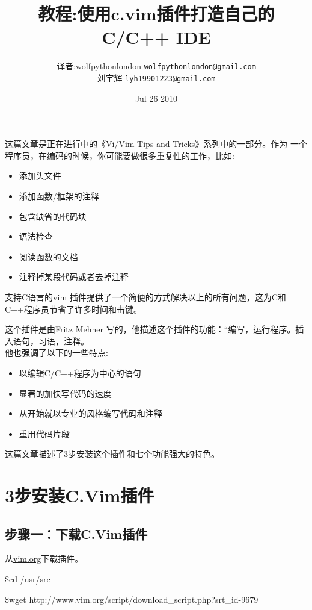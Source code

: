 \documentclass[11pt]{article}
\begin{document}
\title{教程:使用c.vim插件打造自己的C/C++ IDE}
\author{译者:wolfpythonlondon \texttt{wolfpythonlondon@gmail.com} \\ 刘宇辉 \texttt{lyh19901223@gmail.com}}
\date{Jul 26 2010}
\maketitle

这篇文章是正在进行中的《Vi/Vim Tips and Tricks》系列中的一部分。作为
一个程序员，在编码的时候，你可能要做很多重复性的工作，比如:\\

\begin{itemize}
\item{添加头文件}
\item{添加函数/框架的注释}
\item{包含缺省的代码块}
\item{语法检查}
\item{阅读函数的文档}
\item{注释掉某段代码或者去掉注释}
\end{itemize}

支持C语言的vim 插件提供了一个简便的方式解决以上的所有问题，这为C和C++程序员节省了许多时间和击键。

这个插件是由Fritz Mehner 写的，他描述这个插件的功能：“编写，运行程序。插入语句，习语，注释。\\

他也强调了以下的一些特点:\\
\begin{itemize}
\item{以编辑C/C++程序为中心的语句}
\item{显著的加快写代码的速度}
\item{从开始就以专业的风格编写代码和注释}
\item{重用代码片段}\\
\end{itemize}

这篇文章描述了3步安装这个插件和七个功能强大的特色。

\section*{3步安装C.Vim插件}
\subsection*{步骤一：下载C.Vim插件}
从\href{http://www.vim.org}{vim.org}下载插件。

\$cd /usr/src

\$wget http://www.vim.org/script/download\_script.php?srt\_id-9679
\end{document}
